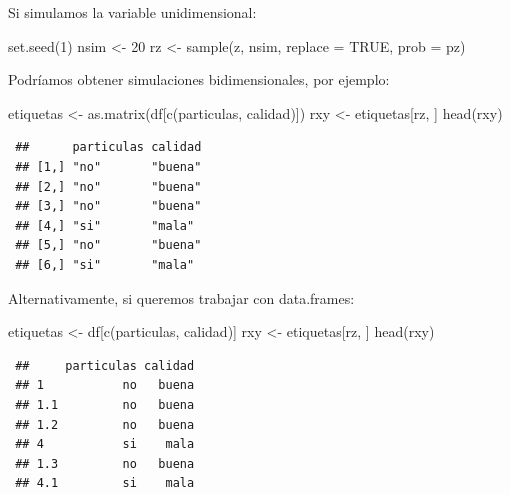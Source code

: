 \documentclass[
]{book}
\newenvironment{Shaded}{\begin{snugshade}}{\end{snugshade}}
\newcommand{\AttributeTok}[1]{\textcolor[rgb]{0.77,0.63,0.00}{#1}}
\newcommand{\ConstantTok}[1]{\textcolor[rgb]{0.00,0.00,0.00}{#1}}
\newcommand{\DecValTok}[1]{\textcolor[rgb]{0.00,0.00,0.81}{#1}}
\newcommand{\FunctionTok}[1]{\textcolor[rgb]{0.00,0.00,0.00}{#1}}
\newcommand{\NormalTok}[1]{#1}
\newcommand{\OtherTok}[1]{\textcolor[rgb]{0.56,0.35,0.01}{#1}}
\newcommand{\StringTok}[1]{\textcolor[rgb]{0.31,0.60,0.02}{#1}}
\theoremstyle{break}
\theoremstyle{nonumberplain}
\begin{document}
Si simulamos la variable unidimensional:

\begin{Shaded}
\begin{Highlighting}[]
\FunctionTok{set.seed}\NormalTok{(}\DecValTok{1}\NormalTok{)}
\NormalTok{nsim }\OtherTok{\textless{}{-}} \DecValTok{20}
\NormalTok{rz }\OtherTok{\textless{}{-}} \FunctionTok{sample}\NormalTok{(z, nsim, }\AttributeTok{replace =} \ConstantTok{TRUE}\NormalTok{, }\AttributeTok{prob =}\NormalTok{ pz)}
\end{Highlighting}
\end{Shaded}

Podríamos obtener simulaciones bidimensionales, por ejemplo:

\begin{Shaded}
\begin{Highlighting}[]
\NormalTok{etiquetas }\OtherTok{\textless{}{-}} \FunctionTok{as.matrix}\NormalTok{(df[}\FunctionTok{c}\NormalTok{(}\StringTok{\textquotesingle{}particulas\textquotesingle{}}\NormalTok{, }\StringTok{\textquotesingle{}calidad\textquotesingle{}}\NormalTok{)])}
\NormalTok{rxy }\OtherTok{\textless{}{-}}\NormalTok{ etiquetas[rz, ]}
\FunctionTok{head}\NormalTok{(rxy)}
\end{Highlighting}
\end{Shaded}

\begin{verbatim}
 ##      particulas calidad
 ## [1,] "no"       "buena"
 ## [2,] "no"       "buena"
 ## [3,] "no"       "buena"
 ## [4,] "si"       "mala" 
 ## [5,] "no"       "buena"
 ## [6,] "si"       "mala"
\end{verbatim}

Alternativamente, si queremos trabajar con data.frames:

\begin{Shaded}
\begin{Highlighting}[]
\NormalTok{etiquetas }\OtherTok{\textless{}{-}}\NormalTok{ df[}\FunctionTok{c}\NormalTok{(}\StringTok{\textquotesingle{}particulas\textquotesingle{}}\NormalTok{, }\StringTok{\textquotesingle{}calidad\textquotesingle{}}\NormalTok{)]}
\NormalTok{rxy }\OtherTok{\textless{}{-}}\NormalTok{ etiquetas[rz, ]}
\FunctionTok{head}\NormalTok{(rxy)}
\end{Highlighting}
\end{Shaded}

\begin{verbatim}
 ##     particulas calidad
 ## 1           no   buena
 ## 1.1         no   buena
 ## 1.2         no   buena
 ## 4           si    mala
 ## 1.3         no   buena
 ## 4.1         si    mala
\end{verbatim}
\end{document}
